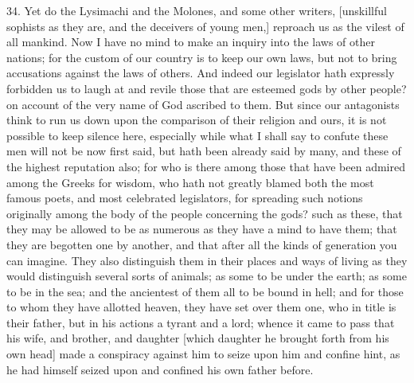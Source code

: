 34. Yet do the Lysimachi and the Molones, and some other writers,
[unskillful sophists as they are, and the deceivers of young men,]
reproach us as the vilest of all mankind. Now I have no mind to make an
inquiry into the laws of other nations; for the custom of our country is
to keep our own laws, but not to bring accusations against the laws of
others. And indeed our legislator hath expressly forbidden us to laugh at
and revile those that are esteemed gods by other people? on account of the
very name of God ascribed to them. But since our antagonists think to run
us down upon the comparison of their religion and ours, it is not possible
to keep silence here, especially while what I shall say to confute these
men will not be now first said, but hath been already said by many, and
these of the highest reputation also; for who is there among those that
have been admired among the Greeks for wisdom, who hath not greatly blamed
both the most famous poets, and most celebrated legislators, for spreading
such notions originally among the body of the people concerning the gods?
such as these, that they may be allowed to be as numerous as they have a
mind to have them; that they are begotten one by another, and that after
all the kinds of generation you can imagine. They also distinguish them in
their places and ways of living as they would distinguish several sorts of
animals; as some to be under the earth; as some to be in the sea; and the
ancientest of them all to be bound in hell; and for those to whom they
have allotted heaven, they have set over them one, who in title is their
father, but in his actions a tyrant and a lord; whence it came to pass
that his wife, and brother, and daughter [which daughter he brought forth
from his own head] made a conspiracy against him to seize upon him and
confine hint, as he had himself seized upon and confined his own father
before.

